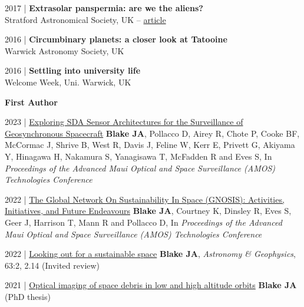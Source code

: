 \documentclass[10pt,a4paper]{altacv}
\begin{document}
\smallskip

\small 2017 | \textbf{Extrasolar panspermia: are we the aliens?} \\
Stratford Astronomical Society, UK -- \href{http://www.astro.org.uk/news/nov17/}{article}

\smallskip

\small 2016 | \textbf{Circumbinary planets: a closer look at Tatooine} \\
Warwick Astronomy Society, UK

\smallskip

\small 2016 | \textbf{Settling into university life} \\
Welcome Week, Uni. Warwick, UK

\medskip


\normalsize \textbf{First Author} 

\medskip

\small
2023 | \href{https://www.researchgate.net/publication/374144515_Exploring_SDA_Sensor_Architectures_for_the_Surveillance_of_Geosynchronous_Spacecraft}{Exploring SDA Sensor Architectures for the Surveillance of Geosynchronous Spacecraft}
\textbf{Blake JA}, Pollacco D, Airey R, Chote P, Cooke BF, McCormac J, Shrive B, West R, Davis J, Feline W, Kerr E, Privett G, Akiyama Y, Hinagawa H, Nakamura S, Yanagisawa T, McFadden R and Eves S, In \textit{Proceedings of the Advanced Maui Optical and Space Surveillance (AMOS) Technologies Conference}

\smallskip

\small
2022 | \href{https://www.researchgate.net/publication/363157906_The_Global_Network_On_Sustainability_In_Space_GNOSIS_Activities_Initiatives_and_Future_Endeavours}{The Global Network On Sustainability In Space (GNOSIS): Activities, Initiatives, and Future Endeavours}
\textbf{Blake JA}, Courtney K, Dinsley R, Eves S, Geer J, Harrison T, Mann R and Pollacco D, In \textit{Proceedings of the Advanced Maui Optical and Space Surveillance (AMOS) Technologies Conference}

\smallskip

\small
2022 | \href{https://academic.oup.com/astrogeo/article/63/2/2.14/6546993}{Looking out for a sustainable space}
\textbf{Blake JA}, \textit{Astronomy \& Geophysics}, 63:2, 2.14 (Invited review)

\smallskip

\small
2021 | \href{https://www.researchgate.net/publication/355472603_Optical_imaging_of_space_debris_in_low_and_high_altitude_orbits}{Optical imaging of space debris in low and high altitude orbits}
\textbf{Blake JA} (PhD thesis)
\end{document}
